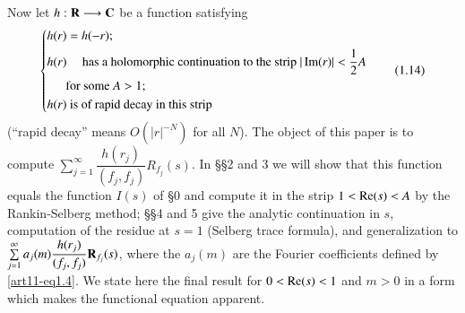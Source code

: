 Now let $h : \mathbf{R} \longrightarrow \mathbf{C}$ be a function satisfying 
\begin{equation*}
\left\{
\begin{aligned}
& h(r) = h(-r);\\
& h(r) \quad \text{ has a holomorphic continuation to the strip } |\operatorname{Im}(r)|< \frac{1}{2} A \\
& \quad \quad~~ \text{ for some } A > 1;\\
& h(r) \text{ is of rapid decay in this strip}
\end{aligned}
\right. \tag{1.14}\label{art11-eq1.14}
\end{equation*}
(``rapid decay'' means $O(|r|^{-N})$ for all $N$). The object of this paper is to compute $\sum\limits^\infty_{j=1} \dfrac{h(r_j)}{(f_j , f_j)} R_{f_j} (s)$. In \S \S 2 and 3 we will show that this function equals the function $I(s)$ of \S 0 and compute it in the strip $1 < \operatorname{Re} (s) < A$ by the Rankin-Selberg method; \S\S 4 and 5 give the analytic continuation in $s$, computation of the residue at $s=1$ (Selberg trace formula), and generalization to $\sum\limits^\infty_{j=1} a_j (m) \dfrac{h(r_j)}{(f_j, f_j)} \mathbf{R}_{f_j} (s)$, where the $a_j(m)$ are the Fourier coefficients defined by \eqref{art11-eq1.4}. We state here the final result for $0< \operatorname{Re} (s) <1$ and $m>0$ in a form which makes the functional equation apparent. 

